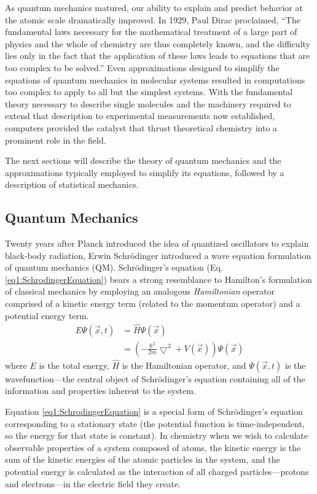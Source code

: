 As quantum mechanics matured, our ability to explain and predict behavior at the
atomic scale dramatically improved. In 1929, Paul Dirac proclaimed, ``The
fundamental laws necessary for the mathematical treatment of a large part of
physics and the whole of chemistry are thus completely known, and the difficulty
lies only in the fact that the application of these laws leads to equations that
are too complex to be solved.'' Even approximations designed to simplify the
equations of quantum mechanics in molecular systems resulted in computations too
complex to apply to all but the simplest systems. With the fundamental theory
necessary to describe single molecules and the machinery required to extend
that description to experimental measurements now established, computers
provided the catalyst that thrust theoretical chemistry into a prominent role in
the field.

The next sections will describe the theory of quantum mechanics and the
approximations typically employed to simplify its equations, followed by
a description of statistical mechanics.

\subsection{Quantum Mechanics}

Twenty years after Planck introduced the idea of quantized oscillators to
explain black-body radiation, Erwin Schr\"odinger introduced a wave equation
formulation of quantum mechanics (QM). \cite{Schrodinger1926} Schr\"odinger's
equation (Eq. \ref{eq1:SchrodingerEquation}) bears a strong resemblance to
Hamilton's formulation of classical mechanics by employing an analogous
\textit{Hamiltonian} operator comprised of a kinetic energy term (related to the
momentum operator) and a potential energy term.
\begin{align}
   E \Psi(\vec{x}, t) & = \hat{H} \Psi(\vec{x}) \nonumber \\
   & = \left ( -\frac {\hbar ^ 2} {2 m} \bigtriangledown ^ 2 + V(\vec{x})
   \right) \Psi(\vec{x})
   \label{eq1:SchrodingerEquation}
\end{align}
where $E$ is the total energy, $\hat{H}$ is the Hamiltonian operator, and
$\Psi(\vec{x}, t)$ is the wavefunction---the central object of Schr\"odinger's
equation containing all of the information and properties inherent to the
system.

Equation \ref{eq1:SchrodingerEquation} is a special form of Schr\"odinger's
equation corresponding to a stationary state (\ie the potential function is
time-independent, so the energy for that state is constant). In chemistry when
we wish to calculate observable properties of a system composed of atoms, the
kinetic energy is the sum of the kinetic energies of the atomic particles in the
system, and the potential energy is calculated as the interaction of all charged
particles---protons and electrons---in the electric field they create.

